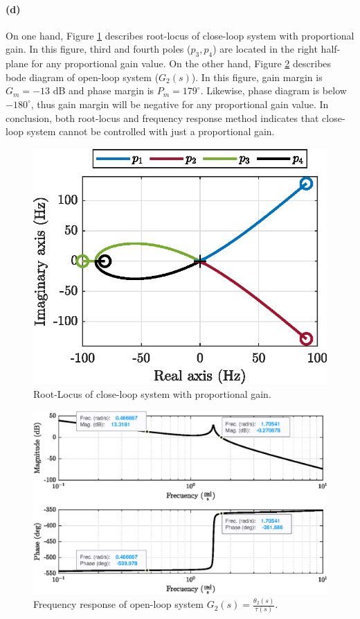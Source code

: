 \paragraph{(d)} On one hand, Figure \ref{fig:q3_rlocus_K_CL} describes root-locus of close-loop system with proportional gain. In this figure, third and fourth poles ($p_3, p_4$) are located in the right half-plane for any proportional gain value. On the other hand, Figure \ref{fig:q3_bode_K_OL} describes bode diagram of open-loop system ($G_2(s)$). In this figure, gain margin is $G_m=-13$ dB and phase margin is $P_m=179^{\circ}$. Likewise, phase diagram is below $-180^{\circ}$, thus gain margin will be negative for any proportional gain value. In conclusion, both root-locus and frequency response method indicates that close-loop system cannot be controlled with just a proportional gain.

\begin{figure}[h!]
\centering
\includegraphics{images/question3/q3_rlocus_K_CL.eps}
\caption{Root-Locus of close-loop system with proportional gain.}
\label{fig:q3_rlocus_K_CL}
\end{figure}


\begin{figure}[h!]
\centering
\includegraphics{images/question3/q3_bode_K_OL.eps}
\caption{Frequency response of open-loop system $G_2(s)=\frac{\theta_2(s)}{\tau(s)}$.}
\label{fig:q3_bode_K_OL}
\end{figure}



